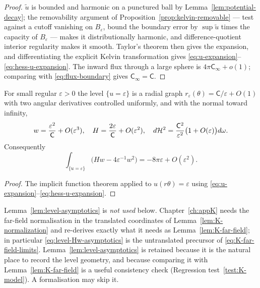 \begin{proof}
$\widetilde u$ is bounded and harmonic on a punctured ball by
Lemma~\ref{lem:potential-decay}; the removability argument of
Proposition~\ref{prop:kelvin-removable} --- test against a cutoff vanishing on
$B_\varepsilon$, bound the boundary error by $\sup\widetilde u$ times the
capacity of $B_\varepsilon$ --- makes it distributionally harmonic, and
difference-quotient interior regularity makes it smooth.  Taylor's theorem
then gives the expansion, and differentiating the explicit Kelvin
transformation gives \eqref{eq:u-expansion}--\eqref{eq:hess-u-expansion}.  The
inward flux through a large sphere is $4\pi\mathsf C_\infty+o(1)$; comparing
with \eqref{eq:flux-boundary} gives $\mathsf C_\infty=\mathsf C$.
\end{proof}

\begin{lemma}\label{lem:level-asymptotics}
For small regular $\varepsilon>0$ the level $\{u=\varepsilon\}$ is a radial
graph $r_\varepsilon(\theta)=\mathsf C/\varepsilon+O(1)$ with two angular
derivatives controlled uniformly, and with the normal toward infinity,
\begin{equation}\label{eq:level-asymptotics}
  w=\frac{\varepsilon^2}{\mathsf C}+O(\varepsilon^3),
  \quad
  H=\frac{2\varepsilon}{\mathsf C}+O(\varepsilon^2),
  \quad
  d\mathcal H^2=\frac{\mathsf C^2}{\varepsilon^2}\bigl(1+O(\varepsilon)\bigr)d\omega .
\end{equation}
Consequently
\begin{equation}\label{eq:level-Hw-asymptotics}
  \int_{\{u=\varepsilon\}}\bigl(Hw-4\varepsilon^{-1}w^2\bigr)
  =-8\pi\varepsilon+O(\varepsilon^2).
\end{equation}
\end{lemma}

\begin{proof}
The implicit function theorem applied to $u(r\theta)=\varepsilon$ using
\eqref{eq:u-expansion}--\eqref{eq:hess-u-expansion}.
\end{proof}

\begin{fnote}\label{fnote:level-asymptotics-unused}
Lemma~\ref{lem:level-asymptotics} is \emph{not used} below.  Chapter~\ref{ch:appK}
needs the far-field normalisation in the translated coordinates of
Lemma~\ref{lem:K-normalization} and re-derives exactly what it needs as
Lemma~\ref{lem:K-far-field}; in particular
\eqref{eq:level-Hw-asymptotics} is the untranslated precursor of
\eqref{eq:K-far-field-limits}.  Lemma~\ref{lem:level-asymptotics} is retained
because it is the natural place to record the level geometry, and because
comparing it with Lemma~\ref{lem:K-far-field} is a useful consistency check
(Regression test~\ref{test:K-model}).  A formalisation may skip it.
\end{fnote}

